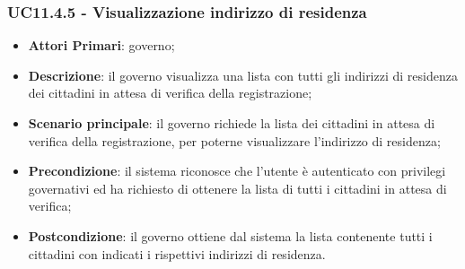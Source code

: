 \subsubsection{UC11.4.5 - Visualizzazione indirizzo di residenza}
\begin{itemize}
	\item \textbf{Attori Primari}: governo;
	\item \textbf{Descrizione}: il governo visualizza una lista con tutti gli indirizzi di residenza dei cittadini in attesa di verifica della registrazione;
	\item \textbf{Scenario principale}: il governo richiede la lista dei cittadini in attesa di verifica della registrazione, per poterne visualizzare l'indirizzo di residenza;
	\item \textbf{Precondizione}: il sistema riconosce che l'utente è autenticato con privilegi governativi ed ha richiesto di ottenere la lista di tutti i cittadini in attesa di verifica;
	\item \textbf{Postcondizione}: il governo ottiene dal sistema la lista contenente tutti i cittadini con indicati i rispettivi indirizzi di residenza.
\end{itemize}